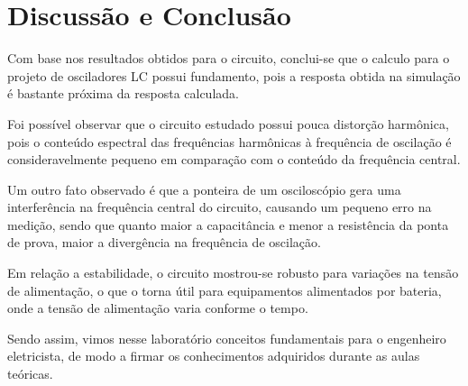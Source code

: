 \newpage
\section{Discussão e Conclusão}
Com base nos resultados obtidos para o circuito, conclui-se que o calculo para o projeto de osciladores LC possui fundamento, pois a resposta obtida na simulação é bastante próxima da resposta calculada.

Foi possível observar que o circuito estudado possui pouca distorção harmônica, pois o conteúdo espectral das frequências harmônicas à frequência de oscilação é consideravelmente pequeno em comparação com o conteúdo da frequência central.

Um outro fato observado é que a ponteira de um osciloscópio gera uma interferência na frequência central do circuito, causando um pequeno erro na medição, sendo que quanto maior a capacitância e menor a resistência da ponta de prova, maior a divergência na frequência de oscilação.

Em relação a estabilidade, o circuito mostrou-se robusto para variações na tensão de alimentação, o que o torna útil para equipamentos alimentados por bateria, onde a tensão de alimentação varia conforme o tempo.

Sendo assim, vimos nesse laboratório conceitos fundamentais para o engenheiro eletricista, de modo a firmar os conhecimentos adquiridos durante as aulas teóricas.